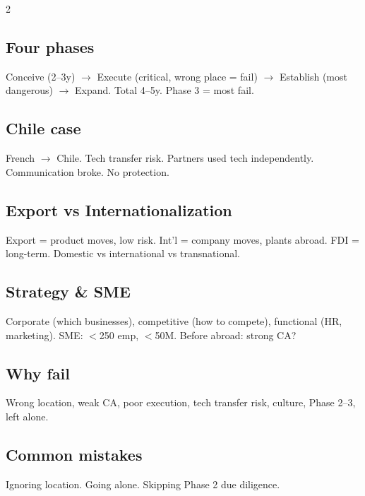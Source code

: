 \documentclass[10pt,landscape,a4paper]{article}
\begin{document}
\begin{multicols}{2}
\subsection*{\color{accent} Four phases}
Conceive (2--3y) $\to$ Execute (critical, wrong place = fail) $\to$ Establish (most dangerous) $\to$ Expand. Total 4--5y. Phase 3 = most fail.

\subsection*{\color{accent} Chile case}
French $\to$ Chile. Tech transfer risk. Partners used tech independently. Communication broke. No protection.

\subsection*{\color{accent} Export vs Internationalization}
Export = product moves, low risk. Int'l = company moves, plants abroad. FDI = long-term. Domestic vs international vs transnational.

\subsection*{\color{accent} Strategy \& SME}
Corporate (which businesses), competitive (how to compete), functional (HR, marketing). SME: $<$250 emp, $<$50M. Before abroad: strong CA?

\subsection*{\color{accent} Why fail}
Wrong location, weak CA, poor execution, tech transfer risk, culture, Phase 2--3, left alone.

\subsection*{\color{accent} Common mistakes}
Ignoring location. Going alone. Skipping Phase 2 due diligence.
\end{multicols}
\end{document}

